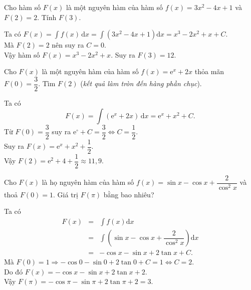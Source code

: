 \documentclass[12pt,aspectratio=169]{beamer}
\begin{document}
\begin{traloi}%
	Cho hàm số $F(x)$ là một nguyên hàm của hàm số $f(x)=3 x^2-4 x+1$ và $F(2)=2$. Tính $F(3)$.

	\begin{loigiai}
		Ta có $F(x)=\displaystyle\int f(x) \mathrm{\,d} x=\displaystyle\int\left(3 x^2-4 x+1\right) \mathrm{d} x=x^3-2 x^2+x+C$.\\
		Mà $F(2)=2$ nên suy ra $C=0$.\\
		Vậy hàm số $F(x)=x^3-2 x^2+x$. Suy ra $F(3)=12$.
	\end{loigiai}
\end{traloi}

\begin{traloi}%
	Cho $F(x)$ là một nguyên hàm của hàm số $f(x)=\mathrm{e}^x+2x$ thỏa mãn $F(0)=\dfrac{3}{2}$. Tìm $F(2)$ (\textit{kết quả làm tròn đến hàng phần chục}).

	\begin{loigiai}
		Ta có \[F(x)=\displaystyle\int \left(\mathrm{e}^x+2x\right)\mathrm{\,d}x=\mathrm{e}^x+x^2+C.\]
		Từ $F(0)=\dfrac{3}{2}$ suy ra $\mathrm{e}^\circ+C=\dfrac{3}{2} \Leftrightarrow C=\dfrac{1}{2}$.\\
		Suy ra $F(x)=\mathrm{e}^x+x^2+\dfrac{1}{2}$.\\
		Vậy $F(2)=\mathrm{e}^2+4+\dfrac{1}{2}\approx 11{,}9$.
	\end{loigiai}
\end{traloi}

\begin{traloi}%
	Cho $F(x)$ là họ nguyên hàm của hàm số $f(x)=\sin x-\cos x+\dfrac{2}{\cos ^2 x}$ và thoả $F(0)=1$. Giá trị $F(\pi)$ bằng bao nhiêu?

	\begin{loigiai}
		Ta có
		\begin{eqnarray*}
			F(x)&=&\int f(x) \mathrm{d} x\\
			&=&\int\left(\sin x-\cos x+\dfrac{2}{\cos ^2 x}\right) \mathrm{d} x\\
			&=&-\cos x-\sin x+2 \tan x+C.
		\end{eqnarray*}
		Mà $F(0)=1 \Rightarrow-\cos 0-\sin 0+2 \tan 0+C=1 \Leftrightarrow C=2$.\\
		Do đó $F(x)=-\cos x-\sin x+2 \tan x+2$. \\
		Vậy $F(\pi)=-\cos \pi-\sin \pi+2 \tan \pi+2=3$.
	\end{loigiai}
\end{traloi}
\end{document}
